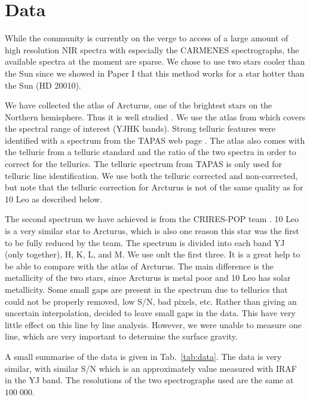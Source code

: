 \documentclass{aa}
\begin{document}
\section{Data}
\label{sec:data}

While the community is currently on the verge to access of a large amount of
high resolution NIR spectra with especially the CARMENES spectrographs, the
available spectra at the moment are sparse. We chose to use two stars cooler
than the Sun since we showed in Paper I that this method works for
a star hotter than the Sun (HD 20010).

We have collected the atlas of Arcturus, one of the brightest stars on the
Northern hemisphere. Thus it is well studied
\citep[see e.g.][to mention just a few]{Griffin1967,McWilliam1990,Ramirez2013}. We
use the atlas from \cite{Hinkle2003} which covers the spectral range of interest
(YJHK bands). Strong telluric features were identified with a spectrum from the
TAPAS web page \citep{Bertaux2014}. The atlas also comes with the telluric from
a telluric standard and the ratio of the two spectra in order to correct for the
tellurics. The telluric spectrum from TAPAS is only used for telluric line
identification. We use both the telluric corrected and non-corrected, but note
that the telluric correction for Arcturus is not of the same quality as for
10 Leo as described below.

The second spectrum we have achieved is from the CRIRES-POP team
\citep{Nicholls2016}. 10 Leo is a very similar star to Arcturus, which is also
one reason this star was the first to be fully reduced by the team. The spectrum
is divided into each band YJ (only together), H, K, L, and M. We use onlt the
first three. It is a great help to be able to compare with the atlas of
Arcturus. The main difference is the metallicity of the two stars, since
Arcturus is metal poor and 10 Leo has solar metallicity. Some small gaps are
present in the spectrum due to tellurics that could not be properly removed, low
S/N, bad pixels, etc. Rather than giving an uncertain interpolation,
\citet{Nicholls2016} decided to leave small gaps in the data. This have very
little effect on this line by line analysis. However, we were unable to measure
one  line, which are very important to determine the surface
gravity.

A small summarise of the data is given in Tab.~\ref{tab:data}. The data is very
similar, with similar S/N which is an approximately value measured with IRAF in
the YJ band. The resolutions of the two spectrographs used are the same at
$100\;000$.
\end{document}
